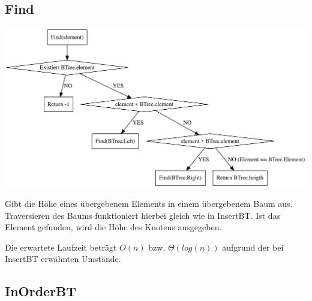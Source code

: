 \documentclass[11pt]{article}
\begin{document}
    \subsection{Find}\label{subsec:find}

    \begin{center}
        \includegraphics[width=1.1\columnwidth] {find.pdf}
    \end{center}

    Gibt die Höhe eines übergebenem Elements in einem übergebenem Baum aus.
    Traversieren des Baums funktioniert hierbei gleich wie in InsertBT.
    Ist das Element gefunden, wird die Höhe des Knotens ausgegeben.

    Die erwartete Laufzeit beträgt
    \begin{math}
        O(n)
    \end {math}
    bzw.
    \begin{math}
        \Theta (log (n))
    \end{math}
    aufgrund der bei InsertBT erwähnten Umstände.

    \subsection{InOrderBT}\label{subsec:inorderbt}
\end{document}
